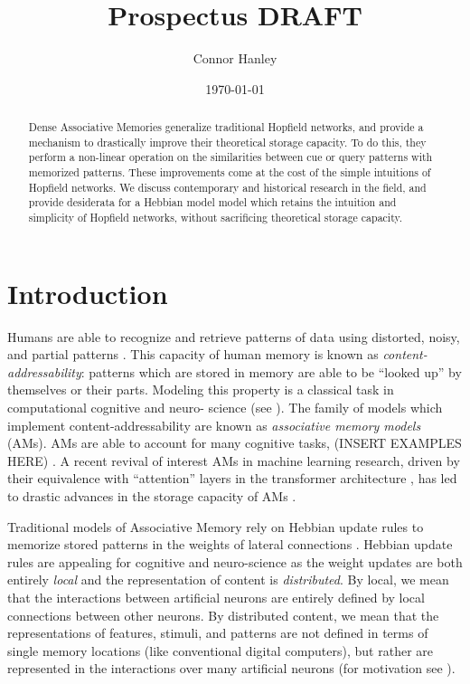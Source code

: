 \documentclass{article}
\title{Prospectus DRAFT}
\author{Connor Hanley}
\date{\today}
\theoremstyle{definition}
\begin{document}
\maketitle

\begin{abstract}
    Dense Associative Memories generalize traditional Hopfield networks, and
    provide a mechanism to drastically improve their theoretical storage
    capacity. To do this, they perform a non-linear operation on the 
    similarities between cue or query patterns with memorized patterns. These
    improvements come at the cost of the simple intuitions of Hopfield networks.
    We discuss contemporary and historical research in the field, and provide
    desiderata for a Hebbian model model which retains the intuition and 
    simplicity of Hopfield networks, without sacrificing theoretical storage
    capacity.
\end{abstract}

\section{Introduction}

Humans are able to recognize and retrieve patterns of data using distorted, 
noisy, and partial patterns \parencite{rumelhart_general_1986}. This 
capacity of human memory is known as \textit{content-addressability}: patterns 
which are stored in memory are able to be ``looked up'' by themselves or their
parts. Modeling this property is a classical task in computational cognitive 
and neuro- science (see \textcites{marr_simple_1971,little_existence_1974,
amari_learning_1972,nakano_associatron-model_1972,stanley_simulation_1976}).
The family of models which implement content-addressability are known 
as \textit{associative memory models} (AMs). AMs are able to account for many
cognitive tasks, (INSERT EXAMPLES HERE) \parencite{hintzman_minerva_1984}.
A recent revival of interest AMs in machine learning research, 
driven by their equivalence with ``attention'' layers in the transformer 
architecture \parencites{vaswani_attention_2023, ramsauer_hopfield_2021}, 
has led to drastic advances in the storage capacity of AMs 
\parencites{demircigil_model_2017,krotov_dense_2016,hu_provably_2024}. 

Traditional models of Associative Memory rely on Hebbian update rules 
to memorize stored patterns in the weights of lateral connections
\parencites{amari_learning_1972,hopfield_neural_1982,kohonen_correlation_1988,
nakano_associatron-model_1972,}. Hebbian update rules are appealing for cognitive
and neuro-science as the weight updates are both entirely \textit{local} and 
the representation of content is \textit{distributed}. By local, we mean
that the interactions between artificial neurons are entirely defined by 
local connections between other neurons. By distributed content, we mean that 
the representations of features, stimuli, and patterns are not defined in terms
of single memory locations (like conventional digital computers), but rather 
are represented in the interactions over many artificial neurons (for motivation
see \textcite{mcclelland_appeal_1986}).
\end{document}
